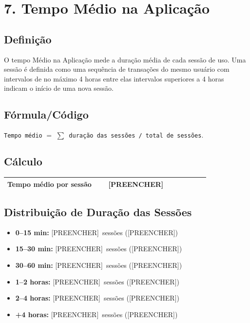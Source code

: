 \documentclass[12pt]{article}
\providecommand{\TempoMedioMin}{[PREENCHER]}
\providecommand{\DurZeroAQuinze}{[PREENCHER]}\providecommand{\DurZeroAQuinzePct}{[PREENCHER]}
\providecommand{\DurQuinzeATrinta}{[PREENCHER]}\providecommand{\DurQuinzeATrintaPct}{[PREENCHER]}
\providecommand{\DurTrintaASessenta}{[PREENCHER]}\providecommand{\DurTrintaASessentaPct}{[PREENCHER]}
\providecommand{\DurUmaADuasHoras}{[PREENCHER]}\providecommand{\DurUmaADuasHorasPct}{[PREENCHER]}
\providecommand{\DurDuasAQuatroHoras}{[PREENCHER]}\providecommand{\DurDuasAQuatroHorasPct}{[PREENCHER]}
\providecommand{\DurMaisDeQuatroHoras}{[PREENCHER]}\providecommand{\DurMaisDeQuatroHorasPct}{[PREENCHER]}
\begin{document}
\section*{7. Tempo Médio na Aplicação}
\subsection*{Definição}
O tempo Médio na Aplicação mede a duração média de cada sessão de uso. Uma sessão é definida como uma sequência de transações do mesmo usuário com intervalos de no máximo 4 horas entre elas intervalos superiores a 4 horas indicam o início de uma nova sessão.

\subsection*{Fórmula/Código}
\noindent \texttt{Tempo médio} $=$ \texttt{$\sum$ duração das sessões / total de sessões}.

\subsection*{Cálculo}
\begin{center}
\begin{tabular}{>{\bfseries}p{0.45\linewidth} p{0.45\linewidth}}
\toprule
Tempo médio por sessão & \TempoMedioMin \\
\bottomrule
\end{tabular}
\end{center}

\subsection*{Distribuição de Duração das Sessões}
\begin{itemize}
  \item \textbf{0--15 min:} \DurZeroAQuinze\ sessões (\DurZeroAQuinzePct)
  \item \textbf{15--30 min:} \DurQuinzeATrinta\ sessões (\DurQuinzeATrintaPct)
  \item \textbf{30--60 min:} \DurTrintaASessenta\ sessões (\DurTrintaASessentaPct)
  \item \textbf{1--2 horas:} \DurUmaADuasHoras\ sessões (\DurUmaADuasHorasPct)
  \item \textbf{2--4 horas:} \DurDuasAQuatroHoras\ sessões (\DurDuasAQuatroHorasPct)
  \item \textbf{+4 horas:} \DurMaisDeQuatroHoras\ sessões (\DurMaisDeQuatroHorasPct)
\end{itemize}
\end{document}
